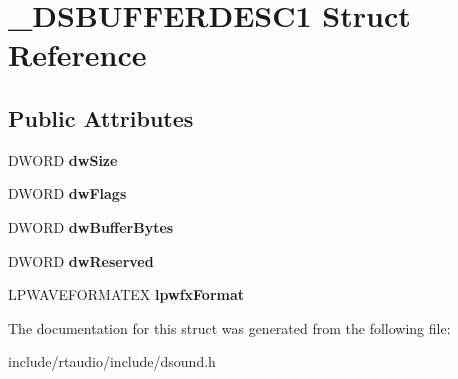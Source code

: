 \hypertarget{struct___d_s_b_u_f_f_e_r_d_e_s_c1}{}\section{\+\_\+\+D\+S\+B\+U\+F\+F\+E\+R\+D\+E\+S\+C1 Struct Reference}
\label{struct___d_s_b_u_f_f_e_r_d_e_s_c1}
\subsection*{Public Attributes}
\begin{DoxyCompactItemize}
\item 
D\+W\+O\+RD {\bfseries dw\+Size}\hypertarget{struct___d_s_b_u_f_f_e_r_d_e_s_c1_ae59037d2c1d1c6a914f8df90381ccfcc}{}\label{struct___d_s_b_u_f_f_e_r_d_e_s_c1_ae59037d2c1d1c6a914f8df90381ccfcc}

\item 
D\+W\+O\+RD {\bfseries dw\+Flags}\hypertarget{struct___d_s_b_u_f_f_e_r_d_e_s_c1_a5cae590221b91727212fdac40f3d06e0}{}\label{struct___d_s_b_u_f_f_e_r_d_e_s_c1_a5cae590221b91727212fdac40f3d06e0}

\item 
D\+W\+O\+RD {\bfseries dw\+Buffer\+Bytes}\hypertarget{struct___d_s_b_u_f_f_e_r_d_e_s_c1_a1da3b865548c46fbe8e8533b257027d0}{}\label{struct___d_s_b_u_f_f_e_r_d_e_s_c1_a1da3b865548c46fbe8e8533b257027d0}

\item 
D\+W\+O\+RD {\bfseries dw\+Reserved}\hypertarget{struct___d_s_b_u_f_f_e_r_d_e_s_c1_af310ac860852aeb409387fb4ef56bd3e}{}\label{struct___d_s_b_u_f_f_e_r_d_e_s_c1_af310ac860852aeb409387fb4ef56bd3e}

\item 
L\+P\+W\+A\+V\+E\+F\+O\+R\+M\+A\+T\+EX {\bfseries lpwfx\+Format}\hypertarget{struct___d_s_b_u_f_f_e_r_d_e_s_c1_a1b20280d535e2df0200a2f156876efc6}{}\label{struct___d_s_b_u_f_f_e_r_d_e_s_c1_a1b20280d535e2df0200a2f156876efc6}

\end{DoxyCompactItemize}


The documentation for this struct was generated from the following file\+:\begin{DoxyCompactItemize}
\item 
include/rtaudio/include/dsound.\+h\end{DoxyCompactItemize}
